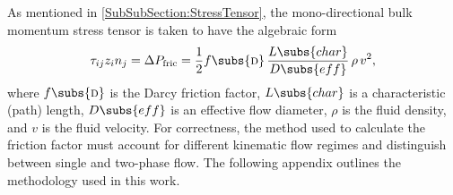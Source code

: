 \label{Appendix:FrictionFactors}

As mentioned in \cref{SubSubSection:StressTensor}, the mono-directional bulk momentum stress tensor is taken to have the algebraic form
\begin{equation}
    \tau_{ij} z_i n_j = \Delta{P}_{\text{fric}} = \frac{1}{2}
        f\subs{\textsc{d}}\,\frac{L\subs{char}}{D\subs{eff}}\,\rho\,v^2,
\end{equation}
where $f\subs{\textsc{d}}$ is the Darcy friction factor, $L\subs{char}$ is a characteristic (path) length, $D\subs{eff}$ is an effective flow diameter, $\rho$ is the fluid density, and $v$ is the fluid velocity.
For correctness, the method used to calculate the friction factor must account for different kinematic flow regimes and distinguish between single and two-phase flow.
The following appendix outlines the methodology used in this work.

